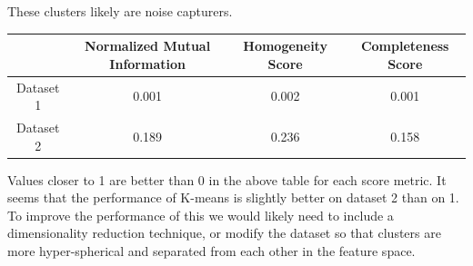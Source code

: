 These clusters likely are noise capturers.
\begin{center}
    \begin{tabular}{|c| c | c | c |}
        \hline
        & Normalized Mutual Information & Homogeneity Score & Completeness Score \\
        \hline
        \hline
        Dataset 1 & 0.001                         & 0.002             & 0.001              \\
        \hline
        Dataset 2 & 0.189                         & 0.236             & 0.158              \\
        \hline
    \end{tabular}
\end{center}
Values closer to 1 are better than 0 in the above table for each score metric.
It seems that the performance of K-means is slightly better on dataset 2 than on 1.
To improve the performance of this we would likely need to include a dimensionality reduction technique, or modify the
dataset so that clusters are more hyper-spherical and separated from each other in the feature space.

